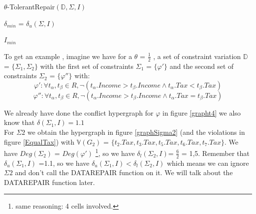 \documentclass[letterpaper, 12pt]{report}
\theoremstyle{definition}
\begin{document}
\IncMargin{1em}
\begin{algorithm}
\label{tetha}

	\DontPrintSemicolon
  \caption{$\theta$-TolerantRepair$(\mathbb{D},\Sigma,I)$}
  \LinesNumbered

    $\delta_{min}$ = $\delta_u(\Sigma,I)$\;

	\Return $I_{min}$

\end{algorithm}\DecMargin{1em}


To get an example , imagine we have for a $\theta$ = $\frac{1}{2}$ , a set of constraint variation $\mathbb{D}$ = $\{\Sigma_1,\Sigma_2\}$ with the first set of constraints $\Sigma_1$ = $\{\varphi'\}$ and the second set of constraints $\Sigma_2$ = $\{\varphi''\}$ with:
$$\varphi': \forall t_\alpha,t_\beta \in R , \neg(t_\alpha.Income > t_\beta.Income \wedge t_\alpha.Tax < t_\beta.Tax)$$
$$\varphi'': \forall t_\alpha,t_\beta \in R , \neg(t_\alpha.Income > t_\beta.Income \wedge t_\alpha.Tax = t_\beta.Tax)$$

We already have done the conflict hypergraph for $\varphi$ in figure \ref{grapht4} we also know that $\delta(\Sigma_1,I)=1.1$\\

For $\Sigma2$ we obtain the hypergraph in figure \ref{graphSigma2} (and the violations in figure \ref{EqualTax}) with $\mathbb{V}(G_2)$ = $\{ t_2.Tax,t_3.Tax,t_5.Tax,t_6.Tax,t_7.Tax\}$. We have $Deg(\Sigma_2)$ = $Deg(\varphi')$ \footnote{same reasoning: 4 cells involved.}, so we have $\delta_l(\Sigma_2,I)$= $\frac{6}{2}$ = 1,5. Remember that $\delta_u(\Sigma_1,I)$ =1.1, so we have $\delta_u(\Sigma_1,I) < \delta_l(\Sigma_2,I)$ which means we can ignore $\Sigma2$ and don't call the DATAREPAIR function on it. We will talk about the DATAREPAIR function later.
\end{document}
